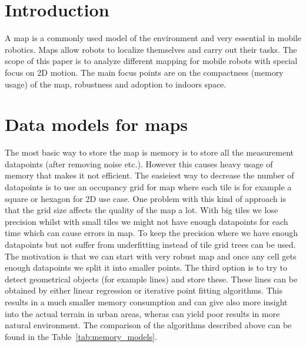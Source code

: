 \documentclass[12pt, a4paper, onecolumn]{article}
\begin{document}
\maketitle

\section{Introduction}
A map is a commonly used model of the environment and very essential in mobile robotics. Maps allow robots to localize themselves and carry out their tasks.
The scope of this paper is to analyze different mapping for mobile robots with special focus on 2D motion.
The main focus points are on the compactness (memory usage) of the map, robustness and adoption to indoors space.


\section{Data models for maps}
The most basic way to store the map is memory is to store all the measurement datapoints (after removing noise etc.).
However this causes heavy usage of memory that makes it not efficient.
The easieiest way to decrease the number of datapoints is to use an occupancy grid for map where each tile is for example a square or hexagon for 2D use case.
One problem with this kind of approach is that the grid size affects the quality of the map a lot.
With big tiles we lose precision whilst with small tiles we might not have enough datapoints for each time which can cause errors in map.
To keep the precision where we have enough datapoints but not suffer from underfitting instead of tile grid trees can be used.
The motivation is that we can start with very robust map and once any cell gets enough datapoints we split it into smaller points.
The third option is to try to detect geometrical objects (for example lines) and store these.
These lines can be obtained by either linear regression or iterative point fitting algorithms.
This results in a much smaller memory consumption and can give also more insight into the actual terrain in urban areas, wheras can yield poor results in more natural environment.
\cite{AlgorithmsForIndoorMapping}
The comparison of the algorithms described above can be found in the Table~\ref{tab:memory_models}.
\end{document}
